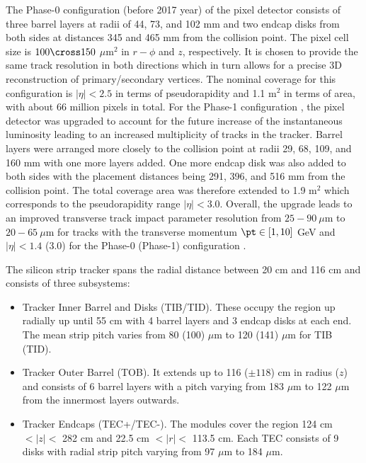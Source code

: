 The Phase-0 configuration (before 2017 year) of the pixel detector consists of three barrel layers at radii of 44, 73, and 102 mm and two endcap disks from both sides at distances 345 and 465 mm from the collision point. The pixel cell size is $100\cross 150$ $\mu\text{m}^2$ in $r-\phi$ and $z$, respectively. It is chosen to provide the same track resolution in both directions which in turn allows for a precise 3D reconstruction of primary/secondary vertices. The nominal coverage for this configuration is $|\eta| < 2.5$ in terms of pseudorapidity and 1.1 $\text{m}^2$ in terms of area, with about 66 million pixels in total. For the Phase-1 configuration \cite{CMSTrackerGroup:2020edz}, the pixel detector was upgraded to account for the future increase of the instantaneous luminosity leading to an increased multiplicity of tracks in the tracker. Barrel layers were arranged more closely to the collision point at radii 29, 68, 109, and 160 mm with one more layers added. One more endcap disk was also added to both sides with the placement distances being 291, 396, and 516 mm from the collision point. The total coverage area was therefore extended to 1.9 $\text{m}^2$ which corresponds to the pseudorapidity range $|\eta| < 3.0$. Overall, the upgrade leads to an improved transverse track impact parameter resolution from $25-90 ~\mu\text{m}$ to $20-65 ~\mu\text{m}$ for tracks with the transverse momentum $\pt \in [1,10]$ GeV and $|\eta|<1.4$ (3.0) for the Phase-0 (Phase-1) configuration \cite{CMS-DP-2020-049}.

The silicon strip tracker spans the radial distance between 20 cm and 116 cm and consists of three subsystems:
\begin{itemize}
    \item Tracker Inner Barrel and Disks (TIB/TID). These occupy the region up radially up until 55 cm with 4 barrel layers and 3 endcap disks at each end. The mean strip pitch varies from 80 (100) $\mu\text{m}$ to  120 (141) $\mu\text{m}$ for TIB (TID).
    \item Tracker Outer Barrel (TOB). It extends up to 116 ($\pm118$) cm in radius ($z$) and consists of 6 barrel layers with a pitch varying from 183 $\mu\text{m}$ to 122 $\mu\text{m}$ from the innermost layers outwards.
    \item Tracker Endcaps (TEC+/TEC-). The modules cover the region 124 cm $< |z| <$ 282 cm and 22.5 cm $< |r| <$ 113.5 cm. Each TEC consists of 9 disks with radial strip pitch varying from 97 $\mu\text{m}$ to 184 $\mu\text{m}$. 
\end{itemize}

